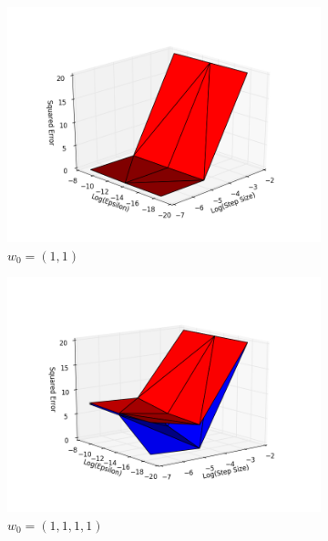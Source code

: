 \documentclass[10pt,psamsfonts]{amsart}
\theoremstyle{definition}
\theoremstyle{remark}
\numberwithin{equation}{section}
\begin{document}
\begin{figure}
	\centering
	\begin{subfigure}[b]{0.24\textwidth}
		\includegraphics[width=\textwidth]{hw1_2-3_0.png}
		\caption{$w_0 = (1,1)$}
	\end{subfigure}
	\begin{subfigure}[b]{0.24\textwidth}
		\includegraphics[width=\textwidth]{hw1_2-3_2.png}
		\caption{$w_0 = (1,1,1,1)$}
	\end{subfigure}
	\begin{subfigure}[b]{0.24\textwidth}

\end{subfigure}
\end{figure}
\end{document}
